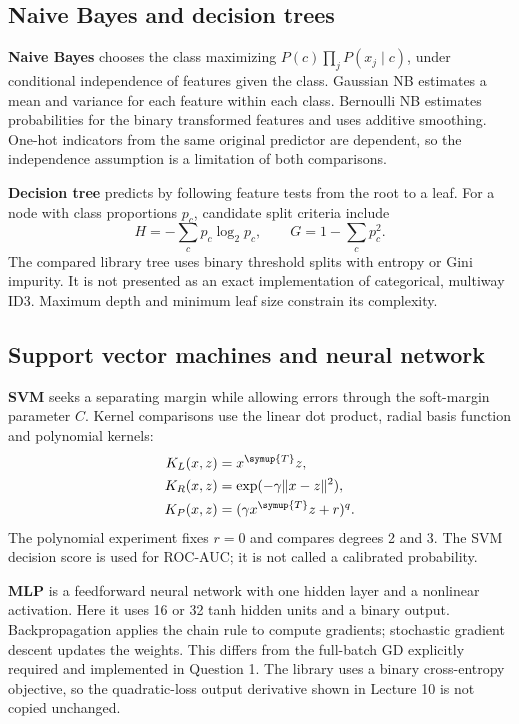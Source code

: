 
\subsection{Naive Bayes and decision trees}
\textbf{Naive Bayes} chooses the class maximizing $P(c)\prod_jP(x_j\mid c)$, under conditional independence of features given the class. Gaussian NB estimates a mean and variance for each feature within each class. Bernoulli NB estimates probabilities for the binary transformed features and uses additive smoothing. One-hot indicators from the same original predictor are dependent, so the independence assumption is a limitation of both comparisons.

\textbf{Decision tree} predicts by following feature tests from the root to a leaf. For a node with class proportions $p_c$, candidate split criteria include
\[
H=-\sum_c p_c\log_2p_c,\qquad G=1-\sum_c p_c^2.
\]
The compared library tree uses binary threshold splits with entropy or Gini impurity. It is not presented as an exact implementation of categorical, multiway ID3. Maximum depth and minimum leaf size constrain its complexity.


\subsection{Support vector machines and neural network}
\textbf{SVM} seeks a separating margin while allowing errors through the soft-margin parameter $C$. Kernel comparisons use the linear dot product, radial basis function and polynomial kernels:
\[
\begin{aligned}
K_L(x,z)&=x^{\symup{T}}z,\\
K_R(x,z)&=\exp(-\gamma\|x-z\|^2),\\
K_P(x,z)&=(\gamma x^{\symup{T}}z+r)^q.
\end{aligned}
\]
The polynomial experiment fixes $r=0$ and compares degrees 2 and 3. The SVM decision score is used for ROC-AUC; it is not called a calibrated probability.

\textbf{MLP} is a feedforward neural network with one hidden layer and a nonlinear activation. Here it uses 16 or 32 tanh hidden units and a binary output. Backpropagation applies the chain rule to compute gradients; stochastic gradient descent updates the weights. This differs from the full-batch GD explicitly required and implemented in Question 1. The library uses a binary cross-entropy objective, so the quadratic-loss output derivative shown in Lecture 10 is not copied unchanged.

